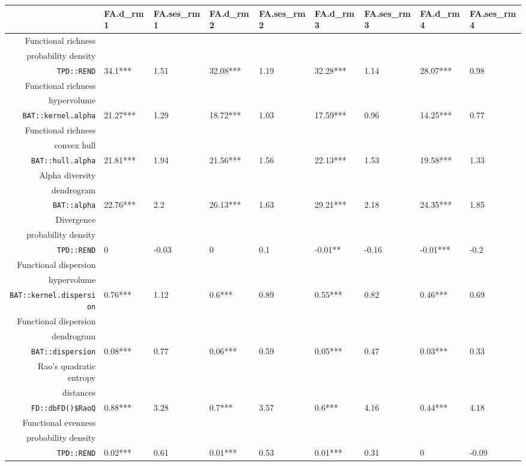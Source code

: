 \begin{table}[ht]
\centering
\scriptsize
\begin{tabular}{rllllllll}
  \hline
 & FA.d\_rm1 & FA.ses\_rm1 & FA.d\_rm2 & FA.ses\_rm2 & FA.d\_rm3 & FA.ses\_rm3 & FA.d\_rm4 & FA.ses\_rm4 \\ 
  \hline
Functional richness\\ probability density\\ \texttt{TPD::REND} & 34.1*** & 1.51 & 32.08*** & 1.19 & 32.28*** & 1.14 & 28.07*** & 0.98 \\ 
  Functional richness\\ hypervolume\\ \texttt{BAT::kernel.alpha} & 21.27*** & 1.29 & 18.72*** & 1.03 & 17.59*** & 0.96 & 14.25*** & 0.77 \\ 
  Functional richness\\ convex hull\\ \texttt{BAT::hull.alpha} & 21.81*** & 1.94 & 21.56*** & 1.56 & 22.13*** & 1.53 & 19.58*** & 1.33 \\ 
  Alpha diversity\\ dendrogram\\ \texttt{BAT::alpha} & 22.76*** & 2.2 & 26.13*** & 1.63 & 29.21*** & 2.18 & 24.35*** & 1.85 \\ 
  Divergence\\ probability density\\ \texttt{TPD::REND} & 0 & -0.03 & 0 & 0.1 & -0.01** & -0.16 & -0.01*** & -0.2 \\ 
  Functional dispersion\\ hypervolume\\ \texttt{BAT::kernel.dispersion} & 0.76*** & 1.12 & 0.6*** & 0.89 & 0.55*** & 0.82 & 0.46*** & 0.69 \\ 
  Functional dispersion\\ dendrogram\\ \texttt{BAT::dispersion} & 0.08*** & 0.77 & 0.06*** & 0.59 & 0.05*** & 0.47 & 0.03*** & 0.33 \\ 
  Rao's quadratic entropy\\ distances\\ \texttt{FD::dbFD()\$RaoQ} & 0.88*** & 3.28 & 0.7*** & 3.57 & 0.6*** & 4.16 & 0.44*** & 4.18 \\ 
  Functional evenness\\ probability density\\ \texttt{TPD::REND} & 0.02*** & 0.61 & 0.01*** & 0.53 & 0.01*** & 0.31 & 0 & -0.09 \\ 

\end{tabular}
\end{table}
